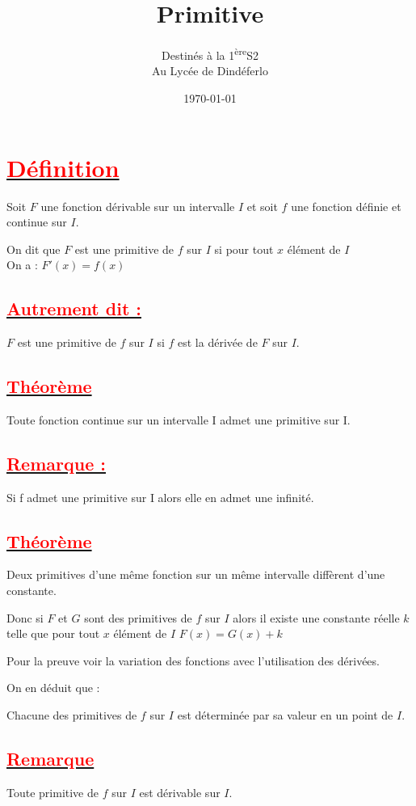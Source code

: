 \documentclass[12pt]{article}
\author{Destinés à la 1\textsuperscript{ère}S2\\Au Lycée de Dindéferlo}
\title{\textbf{Primitive}}
\date{\today}
\begin{document}
\maketitle
\newpage
\section*{\underline{\textbf{\textcolor{red}{Définition}}}}
Soit $F$ une fonction dérivable sur un intervalle $I$ et soit $f$ une fonction définie et continue sur $I$.

On dit que $F$ est une primitive de $f$ sur $I$ si pour tout $x$ élément de $I$\\
On a : $F'(x)=f(x)$
\subsection*{\underline{\textbf{\textcolor{red}{Autrement dit :}}}}
$F$ est une primitive de $f$ sur $I$ si $f$ est la dérivée de $F$ sur $I$.
\subsection*{\underline{\textbf{\textcolor{red}{Théorème}}}}
Toute fonction continue sur un intervalle I admet une primitive sur I.
\subsection*{\underline{\textbf{\textcolor{red}{Remarque :}}}}
Si f admet une primitive sur I alors elle en admet une infinité.
\subsection*{\underline{\textbf{\textcolor{red}{Théorème}}}}
Deux primitives d'une même fonction sur un même intervalle diffèrent d'une constante.
 
Donc si $F$ et $G$ sont des primitives de $f$ sur $I$ alors il existe une constante réelle $k$ telle que pour tout $x$ élément de $I$ $F(x)=G(x)+k$

Pour la preuve voir la variation des fonctions avec l'utilisation des dérivées.
 
On en déduit que : 
 
Chacune des primitives de $f$ sur $I$ est déterminée par sa valeur en un point de $I$.
\subsection*{\underline{\textbf{\textcolor{red}{Remarque}}}}
Toute primitive de $f$ sur $I$ est dérivable sur $I$.
 
\end{document}

